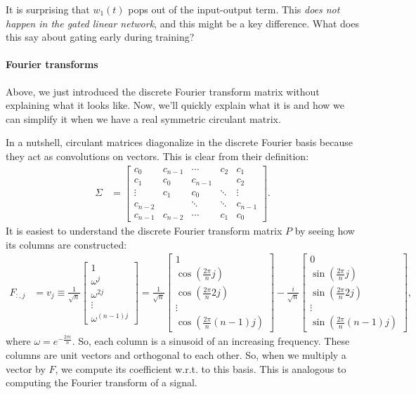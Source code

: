 \documentclass{article}
\begin{document}
It is surprising that $w_1(t)$ pops out of the input-output term.
This \emph{does not happen in the gated linear network}, and this might be a key difference.
What does this say about gating early during training?


\paragraph*{Fourier transforms}
Above, we just introduced the discrete Fourier transform matrix without explaining what it looks like.
Now, we'll quickly explain what it is and how we can simplify it when we have a real symmetric circulant matrix.

In a nutshell, circulant matrices diagonalize in the discrete Fourier basis because they act as convolutions on vectors.
This is clear from their definition:
\begin{align}
  \Sigma &= 
  \begin{bmatrix}
    c_0 & c_{n-1} & \cdots & c_2 & c_1 \\
    c_1 & c_0 & c_{n-1} &  & c_2 \\
    \vdots & c_1 & c_0 & \ddots & \vdots \\
    c_{n-2} &  & \ddots & \ddots & c_{n-1} \\
    c_{n-1} & c_{n-2} & \cdots & c_1 & c_0
  \end{bmatrix}.
\end{align}
It is easiest to understand the discrete Fourier transform matrix $P$ by seeing how its columns are constructed:
\begin{align}
  F_{:,j} 
  &= v_j
  \equiv \frac{1}{\sqrt{n}} \begin{bmatrix} 1 \\ \omega^j \\ \omega^{2j} \\ \vdots \\ \omega^{(n-1)j} \end{bmatrix}
  = \frac{1}{\sqrt{n}} \begin{bmatrix} 1 \\ \cos( \frac{2 \pi}{n} j ) \\ \cos( \frac{2 \pi}{n} 2j ) \\ \vdots \\ \cos( \frac{2 \pi}{n} (n-1) j ) \end{bmatrix}
  - \frac{i}{\sqrt{n}} \begin{bmatrix} 0 \\ \sin( \frac{2 \pi}{n} j ) \\ \sin( \frac{2 \pi}{n} 2j ) \\ \vdots \\ \sin( \frac{2 \pi}{n} (n-1) j ) \end{bmatrix},
\end{align}
where $\omega = e^{-\frac{2 \pi i}{n}}$.
So, each column is a sinusoid of an increasing frequency.
These columns are unit vectors and orthogonal to each other.
So, when we multiply a vector by $F$, we compute its coefficient w.r.t. to this basis.
This is analogous to computing the Fourier transform of a signal.
\end{document}
